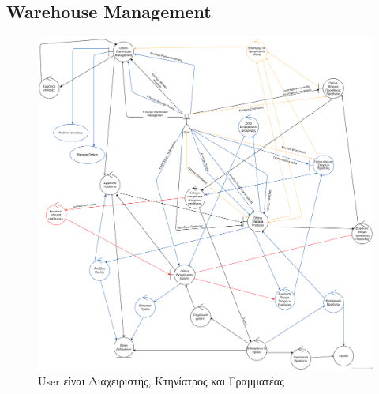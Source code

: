 \documentclass[12pt,a4paper,twoside]{book}
\begin{document}
\subsection{Warehouse Management}
\begin{figure}[H]
    \centering
    \includegraphics[width=\textwidth]{Resources/Robustness Diagram/Warehouse_Management_RD.png}
    \caption{User είναι Διαχειριστής, Κτηνίατρος και Γραμματέας}\label{fig:robustness-warehouse-management}
\end{figure}
\end{document}
